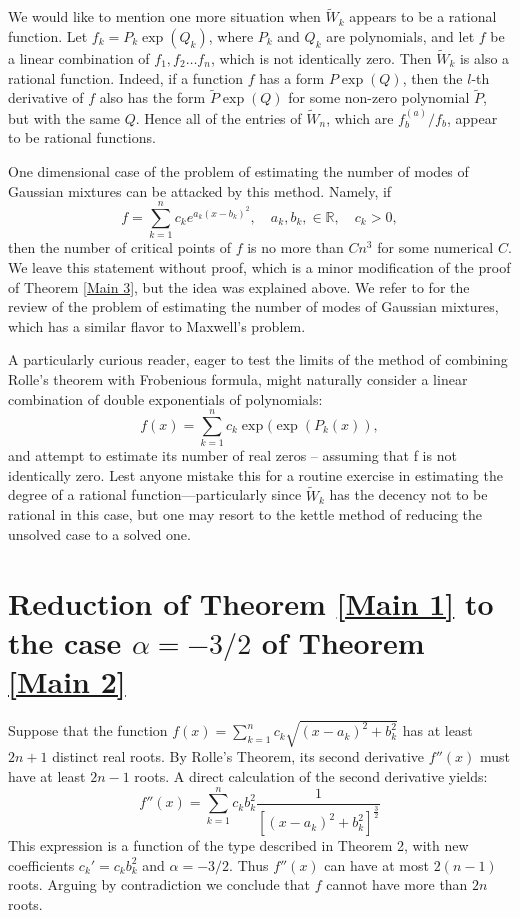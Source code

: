 \documentclass{article}
\begin{document}
We would like to mention one more situation when $\widetilde W_k$ appears to be a rational function. 
Let $f_k=P_k\exp(Q_k)$, where $P_k$ and $Q_k$ are polynomials, and let $f$ be a linear combination of $f_1,f_2\dots f_n$, which is not identically zero. Then $\widetilde W_k$ is also a rational function. Indeed, if  a function $f$ has a form  $P\exp(Q)$, then the $l$-th derivative of $f$ also has the form $\tilde P \exp(Q)$ for some non-zero polynomial $\tilde P$, but with the same $Q$. Hence all of the entries of $\widetilde W_n$, which are $f^{(a)}_b/f_b$, appear to be rational functions.


One dimensional case of the problem of estimating the number of modes of Gaussian mixtures can be attacked by this method. Namely, if $$f=\sum_{k=1}^{n} c_k e^{a_k(x-b_k)^2}, \quad a_k,b_k,\in \mathbb{R}, \quad c_k >0, $$
then the number of critical points of $f$ is no more than $Cn^3$ for some numerical $C$. We leave this statement without proof, which is a minor modification of the proof of Theorem \ref{Main 3}, but the idea was explained above. We refer to \cite{AEH} for the review of the problem of estimating the number of modes of Gaussian mixtures, which has a similar flavor to Maxwell's problem.  

 A particularly curious reader, eager to test the limits of the method of combining Rolle's theorem with Frobenious formula, might naturally consider a linear combination of double exponentials of polynomials: $$f(x)=\sum_{k=1}^{n} c_k \exp(\exp(P_k(x)),$$
and attempt to estimate its number of real zeros -- assuming that f is not identically zero.
Lest anyone mistake this for a routine exercise in estimating the degree of a rational function—particularly since $\widetilde{W}_k$ has the decency not to be rational in this case, but one may resort to the kettle method of reducing the unsolved case to a solved one. 




\section{Reduction of Theorem \ref{Main 1} to the case $\alpha=-3/2$ of Theorem \ref{Main 2}}


Suppose that the function $f(x)=\sum_{k=1}^{n}c_{k}\sqrt{(x-a_{k})^{2}+b_{k}^{2}}$ has at least $2n+1$ distinct real roots. By Rolle's Theorem,  its second derivative $f''(x)$ must have at least $2n-1$ roots. A direct calculation of the second derivative yields:
\[
f''(x)=\sum_{k=1}^{n}c_{k}b_{k}^{2}\frac{1}{[(x-a_{k})^{2}+b_{k}^{2}]^{\frac{3}{2}}}
\]
This expression is a function of the type described in Theorem 2, with new coefficients $c_k' = c_k b_k^2$ and $\alpha = -3/2$. Thus  $f''(x)$ can have at most $2(n-1)$ roots. Arguing by contradiction we conclude that $f$ cannot have more than $2n$ roots.
\end{document}
